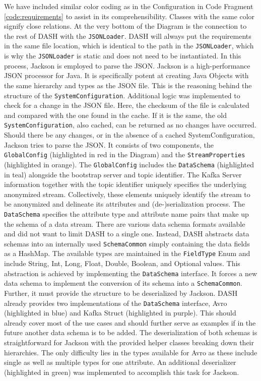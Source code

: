 We have included similar color coding as in the Configuration in Code Fragment \ref{code:requirements} to assist in its comprehensibility. Classes with the same color signify close relations. At the very bottom of the Diagram is the connection to the rest of \ac{DASH} with the \texttt{JSONLoader}. \ac{DASH} will always put the requirements in the same file location, which is identical to the path in the \texttt{JSONLoader}, which is why the \texttt{JSONLoader} is static and does not need to be instantiated. In this process, Jackson is employed to parse the JSON. Jackson is a high-performance JSON processor for Java. It is specifically potent at creating Java Objects with the same hierarchy and types as the JSON file. This is the reasoning behind the structure of the \texttt{SystemConfiguration}. Additional logic was implemented to check for a change in the JSON file. Here, the checksum of the file is calculated and compared with the one found in the cache. If it is the same, the old \texttt{SystemConfiguration}, also cached, can be returned as no changes have occurred. Should there be any changes, or in the absence of a cached SystemConfiguration, Jackson tries to parse the JSON. It consists of two components, the \texttt{GlobalConfig} (highlighted in red in the Diagram) and the \texttt{StreamProperties} (highlighted in orange). The \texttt{GlobalConfig} includes the \texttt{DataSchema} (highlighted in teal) alongside the bootstrap server and topic identifier. The Kafka Server information together with the topic identifier uniquely specifies the underlying anonymized stream. Collectively, these elements uniquely identify the stream to be anonymized and delineate its attributes and (de-)serialization process. The \texttt{DataSchema} specifies the attribute type and attribute name pairs that make up the schema of a data stream. There are various data schema formats available and did not want to limit \ac{DASH} to a single one. Instead, \ac{DASH} abstracts data schemas into an internally used \texttt{SchemaCommon} simply containing the data fields as a HashMap. The available types are maintained in the \texttt{FieldType} Enum and include String, Int, Long, Float, Double, Boolean, and Optional values. This abstraction is achieved by implementing the \texttt{DataSchema} interface. It forces a new data schema to implement the conversion of its schema into a \texttt{SchemaCommon}. Further, it must provide the structure to be deserialized by Jackson. \ac{DASH} already provides two implementations of the \texttt{DataSchema} interface, Avro (highlighted in blue) and Kafka Struct (highlighted in purple). This should already cover most of the use cases and should further serve as examples if in the future another data schema is to be added. The deserialization of both schemas is straightforward for Jackson with the provided helper classes breaking down their hierarchies. The only difficulty lies in the types available for Avro as these include single as well as multiple types for one attribute. An additional deserializer (highlighted in green) was implemented to accomplish this task for Jackson.\par

